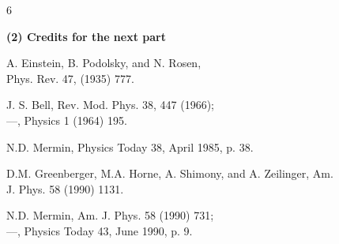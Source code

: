 \documentclass[twocolumn,prb]{revtex4}
\begin{document}
\begin{figure}[htb] 
\begin{mdframed}
  \vspace{5pt}\hfill 6\\[-18pt]
  \begin{center}
    \textbf{(2) Credits for the next part}%
  \end{center}
  \begin{raggedright}
  \begin{enumerate}[label={[\roman*]}]
    \item A. Einstein, B. Podolsky, and N. Rosen,\\ %
      Phys. Rev. 47, (1935) 777. %
    \item J. S. Bell, %
      Rev. Mod. Phys. 38, 447 (1966);\\
      ---, %
      Physics 1 (1964) 195.
    \item N.D. Mermin, %
      Physics Today 38, April 1985, p. 38.

    \item D.M. Greenberger, M.A. Horne, A. Shimony, and A. Zeilinger, %
      Am. J. Phys. 58 (1990) 1131.
      
    \item N.D. Mermin, %
      Am. J. Phys. 58 (1990) 731;\\
      ---, %
      Physics Today 43, June 1990, p. 9.
  \end{enumerate}
  \end{raggedright}
  \vspace{6pt}
\end{mdframed}
\end{figure}
\end{document}
